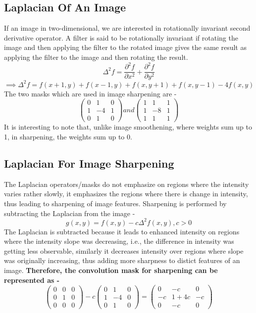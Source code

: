 \documentclass{report}
\begin{document}
\subsection{Laplacian Of An Image}
If an image in two-dimensional, we are interested in rotationally invariant second derivative operator. 
A filter is said to be rotationally invariant if rotating the image and then applying the filter to the rotated image gives the same result as applying the filter to the image and then rotating the result.
\[{\Delta}^2f = \frac{\partial^2 f}{\partial x^2} + \frac{\partial^2 f}{\partial y^2}\]
\[\implies {\Delta}^2f = f(x+1,y) + f(x-1,y) + f(x,y+1) + f(x, y-1) - 4f(x,y)\]
The two masks which are used in image sharpening are -
\[
\begin{pmatrix}
    0 & 1 & 0 \\
    1 & -4 & 1 \\
    0 & 1 & 0
\end{pmatrix}
and 
\begin{pmatrix}
    1 & 1 & 1 \\
    1 & -8 & 1 \\
    1 & 1 & 1
\end{pmatrix}
\]
It is interesting to note that, unlike image smoothening, where weights sum up to 1, in sharpening, the weights sum up to 0.
\subsection{Laplacian For Image Sharpening}
The Laplacian operators/masks do not emphasize on regions where the intensity varies rather slowly, it emphasizes the regions where there is change in intensity, thus leading to sharpening of image features.
Sharpening is performed by subtracting the Laplacian from the image -
\[g(x,y) = f(x,y) - c\Delta^2f(x,y) , c>0\]
The Laplacian is subtracted because it leads to enhanced intensity on regions where the intensity slope was decreasing, i.e., the difference in intensity was getting less observable, similarly it decreases intensity over regions where slope was originally increasing, thus adding more sharpness to distict features of an image.
\textbf{Therefore, the convolution mask for sharpening can be represented as -}
\[
\begin{pmatrix}
    0 & 0 & 0 \\
    0 & 1 & 0 \\
    0 & 0 & 0
\end{pmatrix}
-c
\begin{pmatrix}
    0 & 1 & 0 \\
    1 & -4 & 0 \\
    0 & 1 & 0
\end{pmatrix}
 =
 \begin{pmatrix}
    0 & -c & 0 \\
    -c & 1+4c & -c \\
    0 & -c &  0
 \end{pmatrix}
\]
\end{document}
